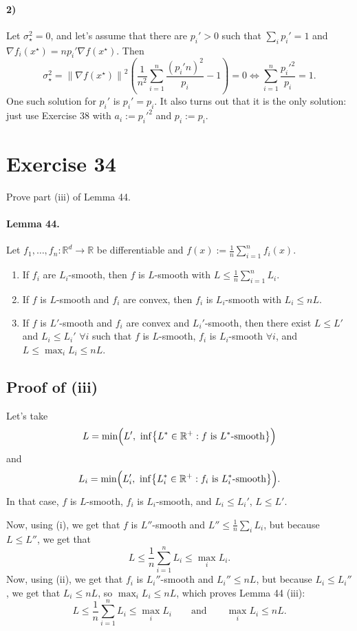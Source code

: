 \documentclass[11pt,a4paper]{article}
\newcommand{\R}{\mathbb{R}}
\newcommand{\norm}[1]{\left\| #1 \right\|}
\newcommand{\xs}{x^\star}
\begin{document}
\paragraph{2)}
Let $\sigma_\star^2 = 0$, and let's assume that there are $p_i' > 0$ such that $\sum_i p_i' = 1$ and
$\nabla f_i(\xs) = np_i'\nabla f(\xs)$. Then
\[
  \sigma_\star^2 = \norm{\nabla f(\xs)}^2\left(\frac{1}{n^2}\sum_{i=1}^n \frac{(p_i'n)^2}{p_i} - 1\right) = 0
  \iff \sum_{i=1}^n \frac{p_i'^2}{p_i} = 1 .
\]
One such solution for $p_i'$ is $p_i' = p_i$. It also turns out that it is the only solution:
just use Exercise 38 with $a_i := p_i'^2$ and $p_i := p_i$.

\section*{Exercise 34}

Prove part (iii) of Lemma 44.

\paragraph{Lemma 44.}
Let $f_1,\dots,f_n : \R^d \to \R$ be differentiable and $f(x) := \frac{1}{n}\sum_{i=1}^n f_i(x)$.
\begin{enumerate}
  \item[(i)] If $f_i$ are $L_i$-smooth, then $f$ is $L$-smooth with $L \le \frac{1}{n}\sum_{i=1}^n L_i$.
  \item[(ii)] If $f$ is $L$-smooth and $f_i$ are convex, then $f_i$ is $L_i$-smooth with $L_i \le nL$.
  \item[(iii)] If $f$ is $L'$-smooth and $f_i$ are convex and $L_i'$-smooth, then there exist
    $L \le L'$ and $L_i \le L_i'$ $\forall i$ such that $f$ is $L$-smooth, $f_i$ is $L_i$-smooth
    $\forall i$, and $L \le \max_i L_i \le nL$.
\end{enumerate}

\subsection*{Proof of (iii)}
Let's take
\[
  L = \min\Bigl(L',\ \inf\bigl\{L^* \in \R^+ : f \text{ is } L^*\text{-smooth}\bigr\}\Bigr)
\]
and
\[
  L_i = \min\Bigl(L_i',\ \inf\bigl\{L_i^* \in \R^+ : f_i \text{ is } L_i^*\text{-smooth}\bigr\}\Bigr).
\]
In that case, $f$ is $L$-smooth, $f_i$ is $L_i$-smooth, and $L_i \le L_i'$, $L \le L'$.

Now, using (i), we get that $f$ is $L''$-smooth and $L'' \le \frac{1}{n}\sum_i L_i$, but because
$L \le L''$, we get that
\[
  L \le \frac{1}{n}\sum_{i=1}^n L_i \le \max_i L_i .
\]
Now, using (ii), we get that $f_i$ is $L_i''$-smooth and $L_i'' \le nL$, but because
$L_i \le L_i''$, we get that $L_i \le nL$, so $\max_i L_i \le nL$, which proves Lemma 44 (iii):
\[
  L \le \frac{1}{n}\sum_{i=1}^n L_i \le \max_i L_i \qquad \text{and} \qquad \max_i L_i \le nL .
\]
\end{document}
